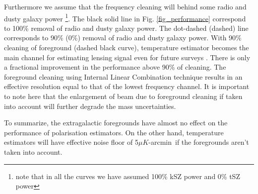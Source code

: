  
 Furthermore we assume that the frequency cleaning will behind some radio and dusty galaxy power \footnote{note that in all the curves we have assumed 100\% kSZ power and 0\% tSZ power}. 
 The black solid line in Fig. \ref{fig_performance} correspond to 100\% removal of radio and dusty galaxy power. 
 The dot-dashed (dashed) line corresponds to 90\% (0\%) removal of radio and dusty galaxy power. 
 With 90\% cleaning of foreground (dashed black curve), temperature estimator becomes the main channel for estimating lensing signal even for future surveys \citep{cmbs4-sb1}.
  There is only a fractional improvement in the performance above 90\% of cleaning. 
  The foreground cleaning using Internal Linear Combination technique results in an effective resolution equal to that of the lowest frequency channel. 
  It is important to note here that the enlargement of beam due to foreground cleaning if taken into account will further degrade the mass uncertainties.%
  
  
  To summarize, the extragalactic foregrounds have almost no effect on the performance of polarisation estimators. 
  On the other hand, temperature estimators will have effective noise floor of 5$\mu K$-arcmin\ if the foregrounds aren't taken into account. %
  
